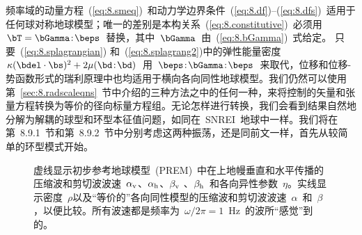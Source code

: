 {频率域的动量方程~(\ref{eq:8.smeq})~和动力学边界条件~(\ref{eq:8.df})--(\ref{eq:8.dfs})~适用于任何球对称地球模型；唯一的差别是本构关系~(\ref{eq:8.constitutive})~必须用~$\bT=\bGamma\!:\!\beps$~替换，其中~$\bGamma$~由~(\ref{eq:8.bGamma})~式给定。
%
只要~(\ref{eq:8.splagrangian}) 和~(\ref{eq:8.splagrang2})中的弹性能量密度~$\kappa(\bdel\cdot\bs)^2+2\mu(\bd\!:\!\bd)$~用~$\beps\!:\!\bGamma\!:\!\beps$~来取代，位移和位移-势函数形式的瑞利原理中也均适用于横向各向同性地球模型。我们仍然可以使用第~\ref{sec:8.radscaleqns}~节中介绍的三种方法之中的任何一种，来将控制的矢量和张量方程转换为等价的径向标量方程组。无论怎样进行转换，我们会看到结果自然地分解为解耦的球型和环型本征值问题，如同在~SNREI~地球中一样。我们将在第~8.9.1~节和第~8.9.2~节中分别考虑这两种振荡，还是同前文一样，首先从较简单的环型模式开始。
\begin{figure}[!t]
\begin{center}
\end{center}
\caption[anisotropicPREM]{\label{fig:anisoprem}
虚线显示初步参考地球模型~(PREM)~中在上地幔垂直和水平传播的压缩波和剪切波波速~$\alpha_{\rm v}$、$\alpha_{\rm h}$、$\beta_{\rm v}$ 、$\beta_{\rm h}$~和各向异性参数~$\eta$。实线显示密度~$\rho$以及“等价的”各向同性模型的压缩波和剪切波波速~$\alpha$~和~$\beta$，以便比较。所有波速都是频率为~$\omega/2\pi=1$~Hz~的波所“感觉”到的。
%
%
%
%
%
%
%
}
\end{figure}

\renewcommand{\thesubsection}{$\!\!\!\raise1.3ex\hbox{$\star$}\!\!$
\arabic{chapter}.\arabic{section}.\arabic{subsection}}
}
